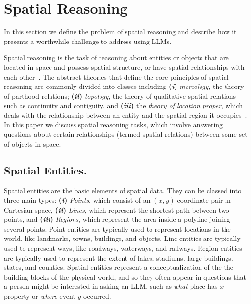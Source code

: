 \section{Spatial Reasoning}
\label{section:background}

In this section we define the problem of spatial reasoning and describe how it presents a worthwhile challenge to address using LLMs.

Spatial reasoning is the task of reasoning about entities or objects that are located in space and possess spatial structure, or have spatial relationships with each other~\cite{Varzi2007}.
The abstract theories that define the core principles of spatial reasoning are commonly divided into classes including 
\textbf{(\textit{i})} \textit{mereology}, the theory of parthood relations;
\textbf{(\textit{ii})} \textit{topology}, the theory of qualitative spatial relations such as continuity and contiguity, and 
\textbf{(\textit{iii})} the \textit{theory of location proper}, which deals with the relationship between an entity and the spatial region it
occupies~\cite{Varzi2007}.
%
In this paper we discuss spatial reasoning tasks, which involve answering questions about certain relationships (termed spatial relations) between some set of objects in space.



\subsection{Spatial Entities.}
Spatial entities are the basic elements of spatial data.
They can be classed into three main types: \textbf{(\textit{i})} \textit{Points}, which consist of an $(x,y)$ coordinate pair in Cartesian space, \textbf{(\textit{ii})} \textit{Lines}, which represent the shortest path between two points, and \textbf{(\textit{iii})} \textit{Regions}, which represent the area inside a polyline joining several points. 
Point entities are typically used to represent locations in the world, like landmarks, towns, buildings, and objects.
Line entities are typically used to represent ways, like roadways, waterways, and railways.
Region entities are typically used to represent the extent of lakes, stadiums, large buildings, states, and counties.
Spatial entities represent a conceptualization of the the building blocks of the physical world, and so they often appear in questions that a person might be interested in asking an LLM, such as \textit{what} place has $x$ property or \textit{where} event $y$ occurred.


